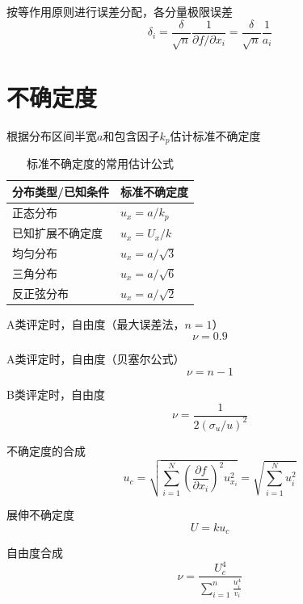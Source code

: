 \documentclass[12pt,a4paper]{ctexart}
\begin{document}
按等作用原则进行误差分配，各分量极限误差
\begin{equation*}
\delta_i=\frac{\delta}{\sqrt{n}}\frac{1}{\partial f/\partial x_i}
=\frac{\delta}{\sqrt{n}}\frac{1}{a_i}
\end{equation*}

\section{不确定度}

根据分布区间半宽$a$和包含因子$k_p$估计标准不确定度

\begin{table}[htbp]
\centering
\caption{标准不确定度的常用估计公式}
\begin{tabular}{ll}
\toprule
分布类型/已知条件 & 标准不确定度 \\
\midrule
正态分布 & $u_x = a/k_p$ \\
已知扩展不确定度 & $u_x = U_x/k$ \\
均匀分布 & $u_x = a/\sqrt{3}$ \\
三角分布 & $u_x = a/\sqrt{6}$ \\
反正弦分布 & $u_x = a/\sqrt{2}$ \\
\bottomrule
\end{tabular}
\end{table}

A类评定时，自由度（最大误差法，$n=1$）
\begin{equation*}
\nu=0.9
\end{equation*}

A类评定时，自由度（贝塞尔公式）
\begin{equation*}
\nu=n-1
\end{equation*}

B类评定时，自由度
\begin{equation*}
\nu=\frac{1}{2\left(\sigma_u/u\right)^2}
\end{equation*}

不确定度的合成
\begin{equation*}
u_c=\sqrt{\sum_{i=1}^{N}\left(\frac{\partial f}{\partial x_i}\right)^2u_{x_i}^2}
=\sqrt{\sum_{i=1}^{N}u_i^2}
\end{equation*}

展伸不确定度
\begin{equation*}
U=ku_c
\end{equation*}

自由度合成
\begin{equation*}
\nu=\frac{U_c^{4}}{\sum_{i=1}^{n} \frac{u_i^4}{v_i}}
\end{equation*}
\end{document}
